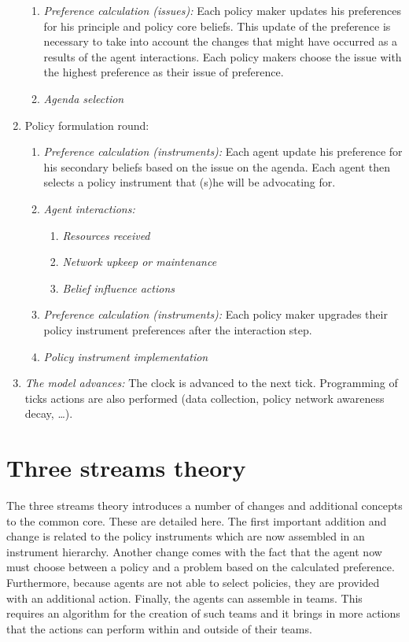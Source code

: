 \begin{enumerate}
\begin{enumerate}
	\item \emph{Preference calculation (issues):} Each policy maker updates his preferences for his principle and policy core beliefs. This update of the preference is necessary to take into account the changes that might have occurred as a results of the agent interactions. Each policy makers choose the issue with the highest preference as their issue of preference.
	\item \emph{Agenda selection}
	\end{enumerate}
	
\item Policy formulation round:

	\begin{enumerate}
	\item \emph{Preference calculation (instruments):} Each agent update his preference for his secondary beliefs based on the issue on the agenda. Each agent then selects a policy instrument that (s)he will be advocating for.
	\item \emph{Agent interactions:} 

		\begin{enumerate}
		\item \emph{Resources received}
		\item \emph{Network upkeep or maintenance}
		\item \emph{Belief influence actions}
		\end{enumerate}

	\item \emph{Preference calculation (instruments):} Each policy maker upgrades their policy instrument preferences after the interaction step.
	\item \emph{Policy instrument implementation} 
	\end{enumerate}
	
\item \emph{The model advances:} The clock is advanced to the next tick. Programming of ticks actions are also performed (data collection, policy network awareness decay, …).

\end{enumerate}

\section{Three streams theory}

The three streams theory introduces a number of changes and additional concepts to the common core. These are detailed here. The first important addition and change is related to the policy instruments which are now assembled in an instrument hierarchy. Another change comes with the fact that the agent now must choose between a policy and a problem based on the calculated preference. Furthermore, because agents are not able to select policies, they are provided with an additional action. Finally, the agents can assemble in teams. This requires an algorithm for the creation of such teams and it brings in more actions that the actions can perform within and outside of their teams.

